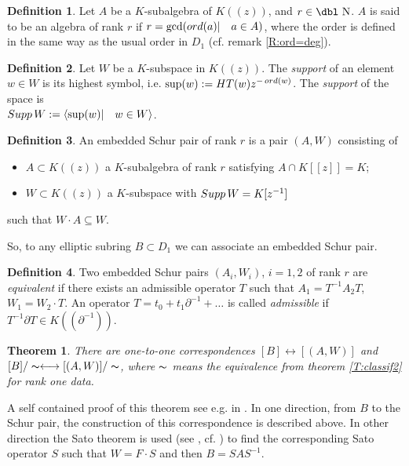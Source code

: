 \documentclass[11pt]{article}
\theoremstyle{definition}
\newcommand{\dn}{{\mbox{\dbl N}}}
\newcommand{\ord}{\mathop{\rm ord}\nolimits}
\newcommand{\Sup}{\mathop {\rm Supp}}
\newtheorem{Def}{Definition}[section]
\theoremstyle{plain}
\newtheorem{theorem}{Theorem}[section]
\numberwithin{equation}{section}
\begin{document}
\begin{Def}
\label{D:Q5.1} 
Let $A$ be a $K$-subalgebra of $K((z))$, and $r\in \dn$. $A$ is said to be an algebra of rank $r$ if 
$r= \gcd (\ord(a)|\quad  a\in A)$, where the order is defined in the same way as the usual order  in $D_1$ (cf. remark \ref{R:ord=deg}).
\end{Def}

\begin{Def}
\label{D:support} 
Let $W$ be a $K$-subspace in $K((z))$. The {\it support} of an element $w\in W$ is its highest symbol, i.e. $\sup (w):=HT(w)z^{-\ord (w)}$. The {\it support} of the space is\\
 $\Sup W:=\langle \sup (w)|\quad w\in W\rangle$. 
\end{Def}

\begin{Def}
\label{D:Schur_pair}
An embedded Schur pair of rank $r$  is a pair $(A,W)$ consisting of 
\begin{itemize}
\item
$A\subset K((z))$ a $K$-subalgebra of rank $r$ satisfying $A\cap K[[z]]=K$;
\item 
$W\subset K((z))$ a $K$-subspace with $\Sup W= K[z^{-1}]$
\end{itemize}
such that $W\cdot A\subseteq W$.
\end{Def} 

So, to any elliptic subring $B\subset D_1$ we can associate an embedded Schur pair. 

\begin{Def}
\label{D:equiv_Schue_pair}
Two embedded Schur pairs   $(A_i, W_i)$, $i=1,2$ of rank $r$ are {\it equivalent} if there exists an admissible operator $T$ such that $A_1=T^{-1}A_2T$, $W_1=W_2\cdot T$. An operator $T=t_0+t_1\partial^{-1}+\ldots $ is called {\it admissible} if $T^{-1}\partial T\in K((\partial^{-1}))$. 
\end{Def}

\begin{theorem}
\label{T:classif_Schur_pairs}
There are one-to-one correspondences  $[B]\longleftrightarrow [(A,W)]$ and $[B]/\thicksim\longleftrightarrow [(A,W)]/\thicksim$, where $\thicksim$ means the equivalence from theorem \ref{T:classif2} for rank one data.
\end{theorem}

A self contained proof of this theorem see e.g. in \cite[10.3]{Zheglov_book}.  In one direction, from $B$ to the Schur pair, the construction of this correspondence is described above. In other direction the Sato theorem is used (see \cite{SN}, cf. \cite[Appendix]{Mu}) to find the corresponding Sato operator $S$ such that $W=F\cdot S$ and then $B=SAS^{-1}$. 
\end{document}
